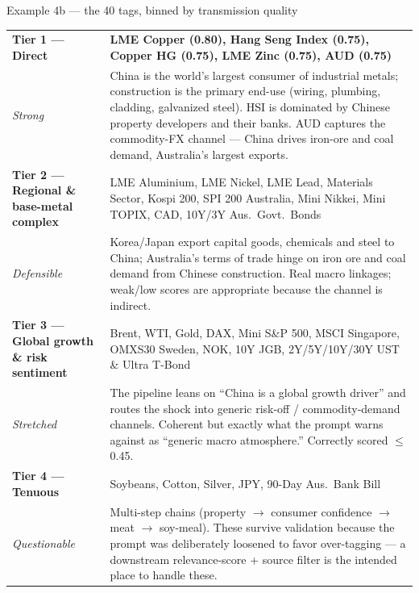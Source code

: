 \documentclass[10pt,aspectratio=169]{beamer}
\begin{document}
\begin{frame}{Example 4b --- the 40 tags, binned by transmission quality}
  \tiny
  \setlength{\tabcolsep}{4pt}
  \renewcommand{\arraystretch}{1.15}
  \begin{tabular}{p{}p{}}
    \toprule
    \textbf{Tier 1 --- Direct} & \textbf{LME Copper (0.80), Hang Seng Index (0.75), Copper HG (0.75), LME Zinc (0.75), AUD (0.75)} \\
    \textcolor{goodgreen}{\emph{Strong}} & China is the world's largest consumer of industrial metals; construction is the primary end-use
    (wiring, plumbing, cladding, galvanized steel). HSI is dominated by Chinese property developers
    and their banks. AUD captures the commodity-FX channel --- China drives iron-ore and coal
    demand, Australia's largest exports. \\
    \midrule
    \textbf{Tier 2 --- Regional \& base-metal complex} & LME Aluminium, LME Nickel, LME Lead, Materials Sector, Kospi 200, SPI 200 Australia,
    Mini Nikkei, Mini TOPIX, CAD, 10Y/3Y Aus.\ Govt.\ Bonds \\
    \emph{Defensible} & Korea/Japan export capital goods, chemicals and steel to China; Australia's
    terms of trade hinge on iron ore and coal demand from Chinese construction. Real macro
    linkages; weak/low scores are appropriate because the channel is indirect. \\
    \midrule
    \textbf{Tier 3 --- Global growth \& risk sentiment} & Brent, WTI, Gold, DAX, Mini S\&P 500, MSCI Singapore, OMXS30 Sweden, NOK, 10Y JGB,
    2Y/5Y/10Y/30Y UST \& Ultra T-Bond \\
    \emph{Stretched} & The pipeline leans on ``China is a global growth driver'' and routes the
    shock into generic risk-off / commodity-demand channels. Coherent but exactly what the prompt
    warns against as ``generic macro atmosphere.'' Correctly scored $\leq$ 0.45. \\
    \midrule
    \textbf{Tier 4 --- Tenuous} & Soybeans, Cotton, Silver, JPY, 90-Day Aus.\ Bank Bill \\
    \textcolor{red!70!black}{\emph{Questionable}} & Multi-step chains (property $\rightarrow$
    consumer confidence $\rightarrow$ meat $\rightarrow$ soy-meal). These survive validation
    because the prompt was deliberately loosened to favor over-tagging --- a downstream
    relevance-score + source filter is the intended place to handle these. \\
    \bottomrule
  \end{tabular}
\end{frame}
\end{document}
